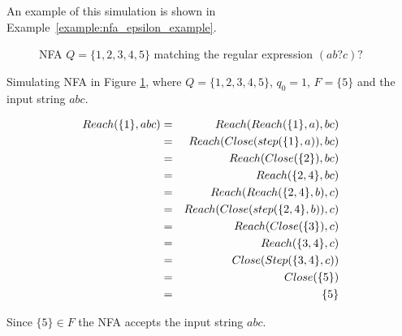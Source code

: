 \documentclass[12pt]{article}
\theoremstyle{definition}
\begin{document}
An example of this simulation is shown in Example~\ref{example:nfa_epsilon_example}.

\begin{figure}[H]
  \begin{center}

	
	\caption{NFA $Q = \{1, 2, 3, 4, 5\}$ matching the regular expression \underline{$(ab?c)?$}}
	\label{nfa_epsilon}
  \end{center}
\end{figure}

\begin{example}
\label{example:nfa_epsilon_example}
Simulating NFA in Figure \ref{nfa_epsilon}, where $Q = \{1, 2, 3, 4, 5\}$, $q_0 = 1$, $F = \{5\}$ and the input string $abc$.

\begin{eqnarray}
Reach(\{1\}, abc) &=& Reach(Reach(\{1\}, a), bc) \notag \\
&=& Reach(Close(step(\{1\}, a)), bc) \notag \\
&=& Reach(Close(\{2\}), bc) \notag \\
&=& Reach(\{2,4\}, bc) \notag \\
&=& Reach(Reach(\{2,4\}, b), c) \notag \\
&=& Reach(Close(step(\{2,4\}, b)), c) \notag \\
&=& Reach(Close(\{3\}), c) \notag \\
&=& Reach(\{3,4\}, c) \notag \\
&=& Close(Step(\{3,4\}, c)) \notag \\
&=& Close(\{5\}) \notag \\
&=& \{5\} \notag 
\end{eqnarray}

Since $\{5\} \in F$ the NFA accepts the input string $abc$.
\end{example}
\end{document}
